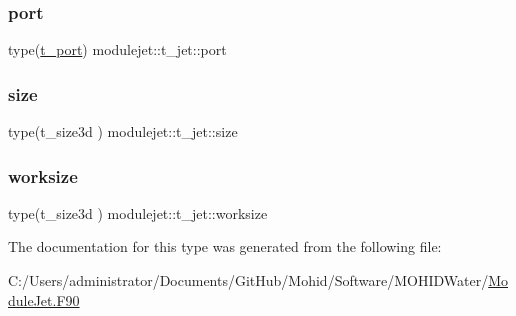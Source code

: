 \subsubsection{\texorpdfstring{port}{port}}
{\footnotesize\ttfamily type(\mbox{\hyperlink{structmodulejet_1_1t__port}{t\+\_\+port}}) modulejet\+::t\+\_\+jet\+::port\hspace{0.3cm}{\ttfamily [private]}}

\mbox{\label{structmodulejet_1_1t__jet_a77ec6f10368a46d258faa06d9548cd19}} 
\subsubsection{\texorpdfstring{size}{size}}
{\footnotesize\ttfamily type(t\+\_\+size3d ) modulejet\+::t\+\_\+jet\+::size\hspace{0.3cm}{\ttfamily [private]}}

\mbox{\label{structmodulejet_1_1t__jet_abc97257c54f2dae5ec3934ead414249d}} 
\subsubsection{\texorpdfstring{worksize}{worksize}}
{\footnotesize\ttfamily type(t\+\_\+size3d ) modulejet\+::t\+\_\+jet\+::worksize\hspace{0.3cm}{\ttfamily [private]}}



The documentation for this type was generated from the following file\+:\begin{DoxyCompactItemize}
\item 
C\+:/\+Users/administrator/\+Documents/\+Git\+Hub/\+Mohid/\+Software/\+M\+O\+H\+I\+D\+Water/\mbox{\hyperlink{_module_jet_8_f90}{Module\+Jet.\+F90}}\end{DoxyCompactItemize}
